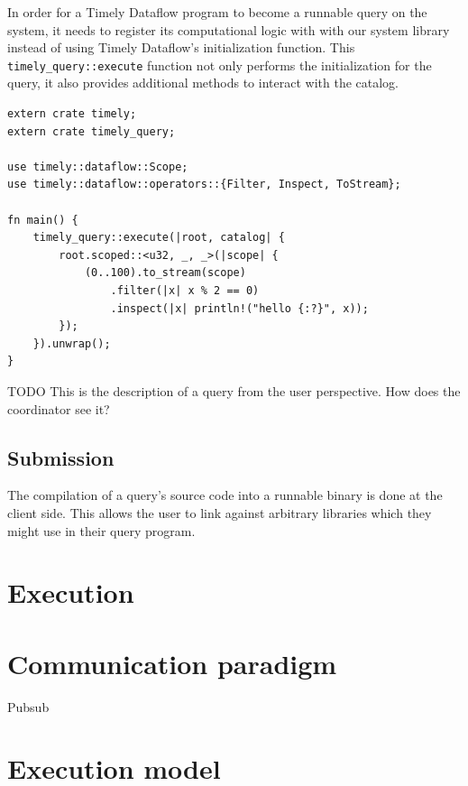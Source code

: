 In order for a Timely Dataflow program to become a runnable query on the system,
it needs to register its computational logic with with our system library instead of
using Timely Dataflow's initialization function. This
\lstinline{timely_query::execute} function not only performs the initialization
for the query, it also provides additional methods to interact with the catalog.

\begin{lstlisting}[caption={[Example query.]Example query which creates a stream of integers,
filters out all odd numbers and then prints the rest.}]
extern crate timely;
extern crate timely_query;

use timely::dataflow::Scope;
use timely::dataflow::operators::{Filter, Inspect, ToStream};

fn main() {
    timely_query::execute(|root, catalog| {
        root.scoped::<u32, _, _>(|scope| {
            (0..100).to_stream(scope)
                .filter(|x| x % 2 == 0)
                .inspect(|x| println!("hello {:?}", x));
        });
    }).unwrap();
}
\end{lstlisting}


TODO This is the description of a query from the user perspective. How does the
coordinator see it?

\subsection{Submission}

The compilation of a query's source code into a runnable binary is done
at the client side. This allows the user to link against arbitrary
libraries which they might use in their query program. 

\section{Execution}



\section{Communication paradigm}

Pubsub

\section{Execution model}
